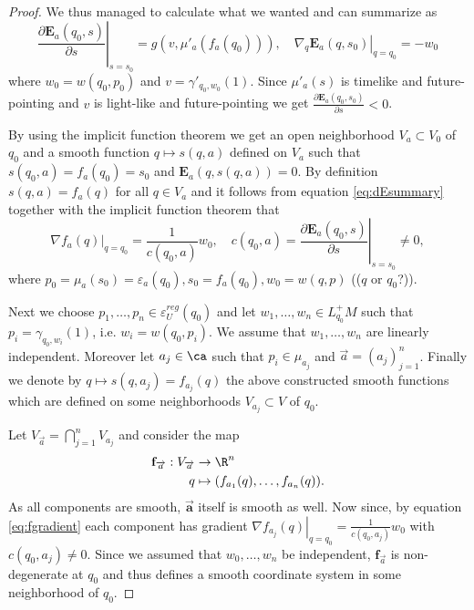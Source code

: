 \begin{proof}
We thus managed to calculate what we wanted and can summarize as
\begin{equation}\label{eq:dEsummary}
    \left.\frac{\partial\mathbf{E}_a(q_0,s)}{\partial s}\right\rvert_{s=s_0} = g(v,\mu'_a(f_a(q_0))), \quad \left.\nabla_q\mathbf{E}_a(q,s_0)\right\rvert_{q=q_0}=-w_0
\end{equation}
where $w_0=w(q_0,p_0)$ and $v=\gamma'_{q_0,w_0}(1)$. Since $\mu'_a(s)$ is timelike and future-pointing and $v$ is light-like and future-pointing we get $\frac{\partial\mathbf{E}_a(q_0,s_0)}{\partial s}<0$.

By using the implicit function theorem we get an open neighborhood $V_a\subset V_0$ of $q_0$ and a smooth function $q\mapsto s(q,a)$ defined on $V_a$ such that $s(q_0,a) = f_a(q_0) = s_0$ and $\mathbf{E}_a(q,s(q,a)) = 0$. By definition $s(q,a)=f_a(q)$ for all $q\in V_a$ and it follows from equation \ref{eq:dEsummary} together with the implicit function theorem that 
\begin{equation}\label{eq:fgradient}
    \left.\nabla f_a(q)\right\rvert_{q=q_0} = \frac{1}{c(q_0,a)}w_0, \quad 
    c(q_0,a) = \left.\frac{\partial\mathbf{E}_a(q_0,s)}{\partial s}\right\rvert_{s=s_0}\neq 0,
\end{equation}
where $p_0 = \mu_a(s_0)=\varepsilon_a(q_0), s_0 = f_a(q_0), w_0=w(q,p)$ (($q$ or $q_0$?)).

Next we choose $p_1, \dots, p_n \in \varepsilon_U^{reg}(q_0)$ and let $w_1,\dots,w_n\in L^+_{q_0}M$ such that $p_i = \gamma_{q_0,w_i}(1)$, i.e. $w_i=w(q_0,p_i)$. We assume that $w_1,\dots,w_n$ are linearly independent. Moreover let $a_j \in \ca$ such that $p_i\in \mu_{a_j}$ and $\overrightarrow{a}=(a_j)^n_{j=1}$.
Finally we denote by $q\mapsto s(q,a_j)=f_{a_j}(q)$ the above constructed smooth functions which are defined on some neighborhoods $V_{a_j}\subset V$ of $q_0$.

Let $V_{\overrightarrow{a}} = \bigcap_{j=1}^n V_{a_j}$ and consider the map
\begin{align*}
    \mathbf{f}_{\overrightarrow{a}}:V_{\overrightarrow{a}}&\to \R^n\\
    q&\mapsto (f_{a_1}(q),\dots,f_{a_n}(q)).
\end{align*}
As all components are smooth, $\mathbf{\overrightarrow{a}}$ itself is smooth as well. Now since, by equation \ref{eq:fgradient} each component has gradient $\left.\nabla f_{a_j}(q)\right\rvert_{q=q_0} = \frac{1}{c(q_0,a_j)}w_0$ with $c(q_0,a_j)\neq 0$. Since we assumed that $w_0,\dots,w_n$ be independent, $\mathbf{f}_{\overrightarrow{a}}$ is non-degenerate at $q_0$ and thus defines a smooth coordinate system in some neighborhood of $q_0$.
\end{proof}

